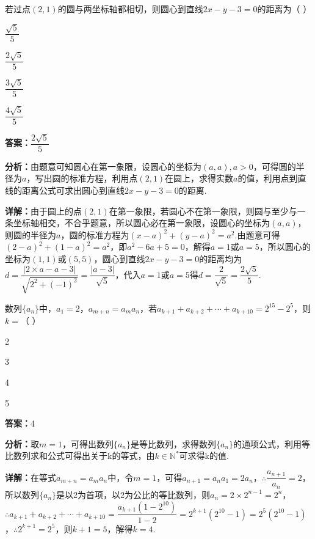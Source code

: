 \begin{question}[points=5]
若过点$(2,1)$的圆与两坐标轴都相切，则圆心到直线$2x-y-3=0$的距离为（ ）
\begin{choices}
  \item $\dfrac{\sqrt5}{5}$
  \item $\dfrac{2\sqrt5}{5}$
  \item $\dfrac{3\sqrt5}{5}$
  \item $\dfrac{4\sqrt5}{5}$
\end{choices}
\begin{solution}
\textbf{答案：}$\dfrac{2\sqrt5}{5}$

\textbf{分析：}由题意可知圆心在第一象限，设圆心的坐标为$(a,a),a>0$，可得圆的半径为$a$，写出圆的标准方程，利用点$(2,1)$在圆上，求得实数$a$的值，利用点到直线的距离公式可求出圆心到直线$2x-y-3=0$的距离.

\textbf{详解：}由于圆上的点$(2,1)$在第一象限，若圆心不在第一象限，则圆与至少与一条坐标轴相交，不合乎题意，所以圆心必在第一象限，设圆心的坐标为$(a,a)$，则圆的半径为$a$，圆的标准方程为$(x-a)^2+(y-a)^2=a^2$.由题意可得$(2-a)^2+(1-a)^2=a^2$，即$a^2-6a+5=0$，解得$a=1$或$a=5$，所以圆心的坐标为$(1,1)$或$(5,5)$，圆心到直线$2x-y-3=0$的距离均为$d=\dfrac{|2\times a - a -3|}{\sqrt{2^2+(-1)^2}}=\dfrac{|a-3|}{\sqrt5}$，代入$a=1$或$a=5$得$d=\dfrac{2}{\sqrt5}=\dfrac{2\sqrt5}{5}$.
\end{solution}
\end{question}

\begin{question}[points=5]
数列$\{a_n\}$中，$a_1=2$，$a_{m+n}=a_m a_n$，若$a_{k+1}+a_{k+2}+\cdots+a_{k+10}=2^{15}-2^5$，则$k=$（ ）
\begin{choices}
  \item 2
  \item 3
  \item 4
  \item 5
\end{choices}
\begin{solution}
\textbf{答案：}4

\textbf{分析：}取$m=1$，可得出数列$\{a_n\}$是等比数列，求得数列$\{a_n\}$的通项公式，利用等比数列求和公式可得出关于k的等式，由$k\in\mathbb{N}^*$可求得k的值.

\textbf{详解：}在等式$a_{m+n}=a_m a_n$中，令$m=1$，可得$a_{n+1}=a_n a_1=2a_n$，$\therefore\dfrac{a_{n+1}}{a_n}=2$，所以数列$\{a_n\}$是以2为首项，以2为公比的等比数列，则$a_n=2\times2^{n-1}=2^n$，$\therefore a_{k+1}+a_{k+2}+\cdots+a_{k+10}=\dfrac{a_{k+1}(1-2^{10})}{1-2}=2^{k+1}(2^{10}-1)=2^5(2^{10}-1)$，$\therefore2^{k+1}=2^5$，则$k+1=5$，解得$k=4$.
\end{solution}
\end{question}

